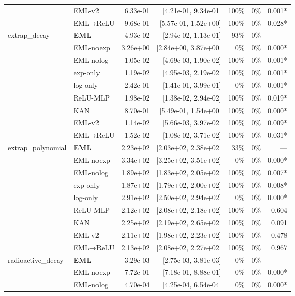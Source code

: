 \begin{table}[t]
\begin{tabular}{llrrrrr}
 & EML-v2 & 6.33e-01 & [4.21e-01, 9.34e-01] & 100\% & 0\% & 0.001* \\
 & EML→ReLU & 9.68e-01 & [5.57e-01, 1.52e+00] & 100\% & 0\% & 0.028* \\
\midrule
extrap\_decay & \textbf{EML} & 4.93e-02 & [2.94e-02, 1.13e-01] & 93\% & 0\% & — \\
 & EML-noexp & 3.26e+00 & [2.84e+00, 3.87e+00] & 0\% & 0\% & 0.000* \\
 & EML-nolog & 1.05e-02 & [4.69e-03, 1.90e-02] & 100\% & 0\% & 0.001* \\
 & exp-only & 1.19e-02 & [4.95e-03, 2.19e-02] & 100\% & 0\% & 0.001* \\
 & log-only & 2.42e-01 & [1.41e-01, 3.99e-01] & 0\% & 0\% & 0.001* \\
 & ReLU-MLP & 1.98e-02 & [1.38e-02, 2.94e-02] & 100\% & 0\% & 0.019* \\
 & KAN & 8.70e-01 & [5.49e-01, 1.54e+00] & 100\% & 0\% & 0.000* \\
 & EML-v2 & 1.14e-02 & [5.66e-03, 3.97e-02] & 100\% & 0\% & 0.009* \\
 & EML→ReLU & 1.52e-02 & [1.08e-02, 3.71e-02] & 100\% & 0\% & 0.031* \\
\midrule
extrap\_polynomial & \textbf{EML} & 2.23e+02 & [2.03e+02, 2.38e+02] & 33\% & 0\% & — \\
 & EML-noexp & 3.34e+02 & [3.25e+02, 3.51e+02] & 0\% & 0\% & 0.000* \\
 & EML-nolog & 1.89e+02 & [1.83e+02, 2.05e+02] & 100\% & 0\% & 0.007* \\
 & exp-only & 1.87e+02 & [1.79e+02, 2.00e+02] & 100\% & 0\% & 0.008* \\
 & log-only & 2.91e+02 & [2.50e+02, 2.94e+02] & 0\% & 0\% & 0.000* \\
 & ReLU-MLP & 2.12e+02 & [2.08e+02, 2.18e+02] & 100\% & 0\% & 0.604 \\
 & KAN & 2.25e+02 & [2.19e+02, 2.65e+02] & 100\% & 0\% & 0.091 \\
 & EML-v2 & 2.11e+02 & [1.98e+02, 2.23e+02] & 100\% & 0\% & 0.478 \\
 & EML→ReLU & 2.13e+02 & [2.08e+02, 2.27e+02] & 100\% & 0\% & 0.967 \\
\midrule
radioactive\_decay & \textbf{EML} & 3.29e-03 & [2.75e-03, 3.81e-03] & 0\% & 0\% & — \\
 & EML-noexp & 7.72e-01 & [7.18e-01, 8.88e-01] & 0\% & 0\% & 0.000* \\
 & EML-nolog & 4.70e-04 & [4.25e-04, 6.54e-04] & 0\% & 0\% & 0.000* \\

\end{tabular}
\end{table}
